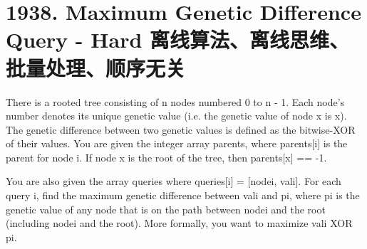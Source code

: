 \documentclass[9pt, b5paaper]{book}
\begin{document}
\section{1938. Maximum Genetic Difference Query - Hard 离线算法、离线思维、批量处理、顺序无关}
\label{sec-9-7}
There is a rooted tree consisting of n nodes numbered 0 to n - 1. Each node's number denotes its unique genetic value (i.e. the genetic value of node x is x). The genetic difference between two genetic values is defined as the bitwise-XOR of their values. You are given the integer array parents, where parents[i] is the parent for node i. If node x is the root of the tree, then parents[x] == -1.

You are also given the array queries where queries[i] = [nodei, vali]. For each query i, find the maximum genetic difference between vali and pi, where pi is the genetic value of any node that is on the path between nodei and the root (including nodei and the root). More formally, you want to maximize vali XOR pi.
\end{document}
